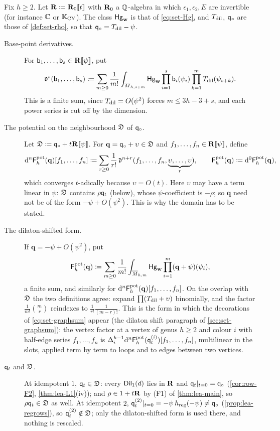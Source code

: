 Fix $h\geq2$. Let $\mathbf{R}\coloneqq\mathbf{R}_0[\![ t ]\!]$ with $\mathbf{R}_0$ a $\mathbb{Q}$-algebra in which $\epsilon_1,\epsilon_2,E$ are invertible (for instance $\mathbb{C}$ or $\mathbb{K}_{\mathrm{CY}}$). The class $\mathsf{Hg}_{\mathbf{w}}$ is that of \eqref{eq:set-Hg}, and $T_{\mathrm{dil}}$, $\mathsf{q}_{\circ}$ are those of \cref{def:set-rho}, so that $\mathsf{q}_{\circ}=T_{\mathrm{dil}}-\psi$.

\begin{defn}
\label{def:set-fpot}
\begin{description}
\item[Base-point derivatives.] For $\mathsf{b}_1,\ldots,\mathsf{b}_s\in\mathbf{R}[\![ \psi ]\!]$, put
\[
\mathfrak{d}^s(\mathsf{b}_1,\ldots,\mathsf{b}_s)\coloneqq\sum_{m\geq0}\frac{1}{m!}\int_{\overline{M}_{h,s+m}}\mathsf{Hg}_{\mathbf{w}}\prod_{i=1}^{s}\mathsf{b}_i(\psi_i)\prod_{k=1}^{m}T_{\mathrm{dil}}(\psi_{s+k}).
\]
This is a finite sum, since $T_{\mathrm{dil}}=O(\psi^2)$ forces $m\leq3h-3+s$, and each power series is cut off by the dimension.
\item[The potential on the neighbourhood $\mathfrak{D}$ of $\mathsf{q}_{\circ}$.] Let $\mathfrak{D}\coloneqq\mathsf{q}_{\circ}+t\mathbf{R}[\![ \psi ]\!]$. For $\mathbf{q}=\mathsf{q}_{\circ}+\upsilon\in\mathfrak{D}$ and $f_1,\ldots,f_n\in\mathbf{R}[\![ \psi ]\!]$, define
\[
\mathrm{d}^n\mathsf{F}^{\mathrm{pot}}_h(\mathbf{q})[f_1,\ldots,f_n]\coloneqq\sum_{r\geq0}\frac{1}{r!}\,\mathfrak{d}^{n+r}(f_1,\ldots,f_n,\underbrace{\upsilon,\ldots,\upsilon}_{r}),\qquad \mathsf{F}^{\mathrm{pot}}_h(\mathbf{q})\coloneqq\mathrm{d}^0\mathsf{F}^{\mathrm{pot}}_h(\mathbf{q}),
\]
which converges $t$-adically because $\upsilon=O(t)$. Here $\upsilon$ may have a term linear in $\psi$: $\mathfrak{D}$ contains $\rho\mathsf{q}_{t}$ (below), whose $\psi$-coefficient is $-\rho$; so $\mathbf{q}$ need not be of the form $-\psi+O(\psi^2)$. This is why the domain has to be stated.
\item[The dilaton-shifted form.] If $\mathbf{q}=-\psi+O(\psi^2)$, put
\[
\mathsf{F}^{\mathrm{pot}}_h(\mathbf{q})\coloneqq\sum_{m\geq0}\frac{1}{m!}\int_{\overline{M}_{h,m}}\mathsf{Hg}_{\mathbf{w}}\prod_{i=1}^{m}(\mathbf{q}+\psi)(\psi_i),
\]
a finite sum, and similarly for $\mathrm{d}^n\mathsf{F}^{\mathrm{pot}}_h(\mathbf{q})[f_1,\ldots,f_n]$. On the overlap with $\mathfrak{D}$ the two definitions agree: expand $\prod(T_{\mathrm{dil}}+\upsilon)$ binomially, and the factor $\frac{1}{m!}\binom mr$ reindexes to $\frac{1}{r!}\frac{1}{(m-r)!}$. This is the form in which the decorations of \eqref{eq:set-graphsum} appear (the dilaton shift paragraph of \cref{sec:set-graphsum}): the vertex factor at a vertex of genus $h\geq2$ and colour $i$ with half-edge series $f_1,\ldots,f_n$ is $\Delta_i^{h-1}\mathrm{d}^n\mathsf{F}^{\mathrm{pot}}_h(\mathsf{q}_{t}^{(i)})[f_1,\ldots,f_n]$, multilinear in the slots, applied term by term to loops and to edges between two vertices.
\item[$\mathsf{q}_{t}$ and $\mathfrak{D}$.] At idempotent $1$, $\mathsf{q}_{t}\in\mathfrak{D}$: every $\mathsf{Dil}_1(d)$ lies in $\mathbf{R}$ and $\mathsf{q}_{t}|_{t=0}=\mathsf{q}_{\circ}$ (\cref{cor:row-F2}, \cref{thm:lea-L1}(iv)); and $\rho\in1+t\mathbf{R}$ by (F1) of \cref{thm:lea-main}, so $\rho\mathsf{q}_{t}\in\mathfrak{D}$ as well. At idempotent $2$, $\mathsf{q}_{t}^{(2)}|_{t=0}=-\psi\,h_{\mathrm{reg}}(-\psi)\neq\mathsf{q}_{\circ}$ (\cref{prop:lea-regrows}), so $\mathsf{q}_{t}^{(2)}\notin\mathfrak{D}$; only the dilaton-shifted form is used there, and nothing is rescaled.

\end{description}
\end{defn}
